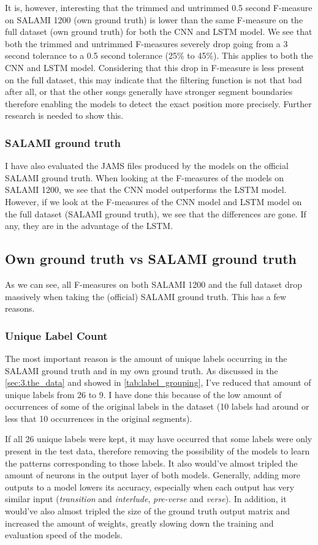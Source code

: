 It is, however, interesting that the trimmed and untrimmed 0.5 second F-measure on SALAMI 1200 (own ground truth) is lower than the same F-measure on the full dataset (own ground truth) for both the CNN and LSTM model. We see that both the trimmed and untrimmed F-measures severely drop going from a 3 second tolerance to a 0.5 second tolerance (25\% to 45\%). This applies to both the CNN and LSTM model. Considering that this drop in F-measure is less present on the full dataset, this may indicate that the filtering function is not that bad after all, or that the other songs generally have stronger segment boundaries therefore enabling the models to detect the exact position more precisely. Further research is needed to show this.

\subsubsection{SALAMI ground truth}
I have also evaluated the JAMS files produced by the models on the official SALAMI ground truth. When looking at the F-measures of the models on SALAMI 1200, we see that the CNN model outperforms the LSTM model. However, if we look at the F-measures of the CNN model and LSTM model on the full dataset (SALAMI ground truth), we see that the differences are gone. If any, they are in the advantage of the LSTM. 

\subsection[Own GT. vs SALAMI GT.]{Own ground truth vs SALAMI ground truth}
\label{sec:gt_vs_salami}
As we can see, all F-measures on both SALAMI 1200 and the full dataset drop massively when taking the (official) SALAMI ground truth. This has a few reasons. 

\subsubsection{Unique Label Count}
The most important reason is the amount of unique labels occurring in the SALAMI ground truth and in my own ground truth. As discussed in the \autoref{sec:3.the_data} and showed in \autoref{tab:label_grouping}, I've reduced that amount of unique labels from 26 to 9. I have done this because of the low amount of occurrences of some of the original labels in the dataset (10 labels had around or less that 10 occurrences in the original segments). 

If all 26 unique labels were kept, it may have occurred that some labels were only present in the test data, therefore removing the possibility of the models to learn the patterns corresponding to those labels. It also would've almost tripled the amount of neurons in the output layer of both models. Generally, adding more outputs to a model lowers its accuracy, especially when each output has very similar input (\textit{transition} and \textit{interlude}, \textit{pre-verse} and \textit{verse}). In addition, it would've also almost tripled the size of the ground truth output matrix and increased the amount of weights, greatly slowing down the training and evaluation speed of the models.

